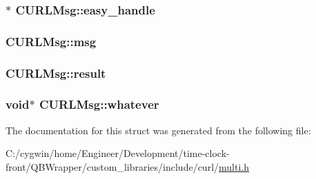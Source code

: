 \subsubsection[{easy\+\_\+handle}]{$\ast$ C\+U\+R\+L\+Msg\+::easy\+\_\+handle}\label{struct_c_u_r_l_msg_a236add50fa3dc85360e4aa7a85a9dfd1}
\hypertarget{struct_c_u_r_l_msg_a805019ce36cd301163b184308220c601}{}
\subsubsection[{msg}]{ C\+U\+R\+L\+Msg\+::msg}\label{struct_c_u_r_l_msg_a805019ce36cd301163b184308220c601}
\hypertarget{struct_c_u_r_l_msg_ac00f26a84ebe0c2c5cb420a47d15ffec}{}
\subsubsection[{result}]{ C\+U\+R\+L\+Msg\+::result}\label{struct_c_u_r_l_msg_ac00f26a84ebe0c2c5cb420a47d15ffec}
\hypertarget{struct_c_u_r_l_msg_ae493c9ae3084340faf1aaa50ebf4b105}{}
\subsubsection[{whatever}]{\setlength{\rightskip}{0pt plus 5cm}void$\ast$ C\+U\+R\+L\+Msg\+::whatever}\label{struct_c_u_r_l_msg_ae493c9ae3084340faf1aaa50ebf4b105}


The documentation for this struct was generated from the following file\+:\begin{DoxyCompactItemize}
\item 
C\+:/cygwin/home/\+Engineer/\+Development/time-\/clock-\/front/\+Q\+B\+Wrapper/custom\+\_\+libraries/include/curl/\hyperlink{multi_8h}{multi.\+h}\end{DoxyCompactItemize}
